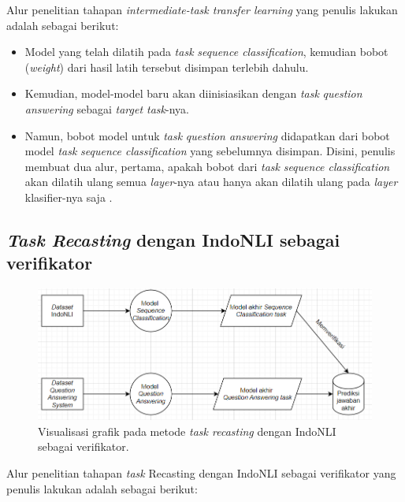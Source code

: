 Alur penelitian tahapan \emph{intermediate-task transfer learning} yang penulis lakukan adalah sebagai berikut:

\begin{itemize}

    \item Model yang telah dilatih pada \emph{task} \emph{sequence classification}, kemudian bobot (\emph{weight}) dari hasil latih tersebut disimpan terlebih dahulu.

    \item Kemudian, model-model baru akan diinisiasikan dengan \emph{task} \emph{question answering} sebagai \emph{target task}-nya.

    \item Namun, bobot model untuk \emph{task} \emph{question answering} didapatkan dari bobot model \emph{task} \emph{sequence classification} yang sebelumnya disimpan. Disini, penulis membuat dua alur, pertama, apakah bobot dari  \emph{task} \emph{sequence classification} akan dilatih ulang semua \emph{layer}-nya atau hanya akan dilatih ulang pada \emph{layer} klasifier-nya saja \citep{lee2019elsa}.

\end{itemize}

\subsection{\emph{Task Recasting} dengan IndoNLI sebagai verifikator}

\begin{figure}[h]
\includegraphics[width=\linewidth]{assets/pics/alur2.png}
\centering
\caption{Visualisasi grafik pada metode \emph{task recasting} dengan IndoNLI sebagai verifikator.}
\end{figure}

Alur penelitian tahapan \emph{task} Recasting dengan IndoNLI sebagai verifikator yang penulis lakukan adalah sebagai berikut:

